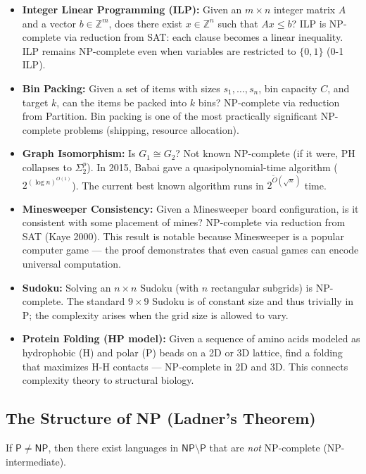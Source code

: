 \begin{itemize}
\item \textbf{Integer Linear Programming (ILP):} Given an $m \times n$ integer matrix $A$ and a vector $b \in \mathbb{Z}^m$, does there exist $x \in \mathbb{Z}^n$ such that $Ax \le b$? ILP is NP-complete via reduction from SAT: each clause becomes a linear inequality. ILP remains NP-complete even when variables are restricted to $\{0,1\}$ (0-1 ILP).
\item \textbf{Bin Packing:} Given a set of items with sizes $s_1, \dots, s_n$, bin capacity $C$, and target $k$, can the items be packed into $k$ bins? NP-complete via reduction from Partition. Bin packing is one of the most practically significant NP-complete problems (shipping, resource allocation).
\item \textbf{Graph Isomorphism:} Is $G_1 \cong G_2$? Not known NP-complete (if it were, PH collapses to $\Sigma_2^p$). In 2015, Babai gave a quasipolynomial-time algorithm ($2^{(\log n)^{O(1)}}$). The current best known algorithm runs in $2^{\tilde{O}(\sqrt{n})}$ time.
\item \textbf{Minesweeper Consistency:} Given a Minesweeper board configuration, is it consistent with some placement of mines? NP-complete via reduction from SAT (Kaye 2000). This result is notable because Minesweeper is a popular computer game — the proof demonstrates that even casual games can encode universal computation.
\item \textbf{Sudoku:} Solving an $n \times n$ Sudoku (with $n$ rectangular subgrids) is NP-complete. The standard $9 \times 9$ Sudoku is of constant size and thus trivially in P; the complexity arises when the grid size is allowed to vary.
\item \textbf{Protein Folding (HP model):} Given a sequence of amino acids modeled as hydrophobic (H) and polar (P) beads on a 2D or 3D lattice, find a folding that maximizes H-H contacts — NP-complete in 2D and 3D. This connects complexity theory to structural biology.
\end{itemize}

\subsection{The Structure of NP (Ladner's Theorem)}
\label{sec:np:ladner}

\begin{theorem}[Ladner 1975]
If $\mathsf{P} \neq \mathsf{NP}$, then there exist languages in $\mathsf{NP} \setminus \mathsf{P}$ that are \emph{not} NP-complete (NP-intermediate).
\end{theorem}

